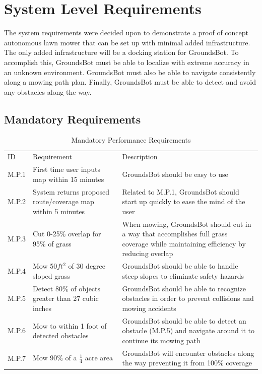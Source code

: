 \documentclass[12pt]{extarticle}
\begin{document}
\newpage
\section{System Level Requirements}

The system requirements were decided upon to demonstrate a proof of concept autonomous lawn mower that can be set up with minimal added infrastructure. The only added infrastructure will be a docking station for GroundsBot. To accomplish this, GroundsBot must be able to localize with extreme accuracy in an unknown environment. GroundsBot must also be able to navigate consistently along a mowing path plan. Finally, GroundsBot must be able to detect and avoid any obstacles along the way.

\subsection{Mandatory Requirements}
\begin{center}
  \begin{table}[H]
  \caption{Mandatory Performance Requirements}
  \label{table:mandatory performance}

  \def\arraystretch{1.5}
  	\begin{tabularx}{\textwidth}{ lXX }
  	  \hline

		\sffamily\normalsize{ID} & \sffamily\normalsize{Requirement} & \sffamily\normalsize{Description} \\
    	M.P.1 &
    	First time user inputs map within 15 minutes &
    	GroundsBot should be easy to use \\
   		M.P.2 &
   		System returns proposed route/coverage map within 5 minutes &
   		Related to M.P.1, GroundsBot should start up quickly to ease the mind of the user \\
   		M.P.3 &
   		Cut 0-25\% overlap for 95\% of grass &
   		When mowing, GroundsBot should cut in a way that accomplishes full grass coverage while maintaining efficiency by reducing overlap\\
		M.P.4 &
		Mow 50$ft^2$ of 30 degree sloped grass &
		GroundsBot should be able to handle steep slopes to eliminate safety hazards \\
		M.P.5 &
		Detect 80\% of objects greater than 27 cubic inches &
		GroundsBot should be able to recognize obstacles in order to prevent collisions and mowing accidents \\
		M.P.6 &
		Mow to within 1 foot of detected obstacles &
		GroundsBot should be able to detect an obstacle (M.P.5) and navigate around it to continue its mowing path \\
		M.P.7 &
		Mow 90\% of a $\frac{1}{4}$ acre area &
		GroundsBot will encounter obstacles along the way preventing it from 100\% coverage \\
	\end{tabularx}
  \end{table}
\end{center}
\end{document}
